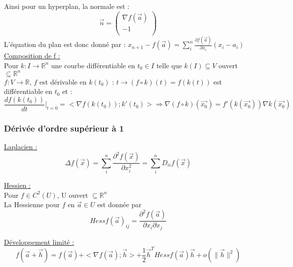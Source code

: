 \documentclass[../main.tex]{subfiles}
\begin{document}
Ainsi pour un hyperplan, la normale est :\\
\begin{equation}
    \vec{n} = \begin{pmatrix}
        \nabla f(\vec{a})\\
        -1\\
    \end{pmatrix}
\end{equation}
L'équation du plan est donc donné par : $x_{n+1} - f(\vec{a}) = \sum_i^n \frac{\partial f(\vec{a})}{\partial x_i}(x_i-a_i)$\\

\quad \underline{Composition de f :}\\
Pour $k: I\rightarrow \mathbb{R}^n$ une courbe différentiable en $t_0 \in I$ telle que $k(I) \subseteq V$ ouvert $\subseteq \mathbb{R}^n$\\
$f: V\rightarrow \mathbb{R}$, $f$ est dérivable en $k(t_0)$ : $t\rightarrow (f\circ k)(t) = f(k(t))$ est différentiable en $t_0$ et :\\
\begin{equation}
    \frac{df(k(t_0))}{dt}\rvert_{t=0} = <\nabla f(k(t_0)); k'(t_0)> \Rightarrow \nabla (f\circ k)(\vec{x_0}) = f'(k(\vec{x_0})) \nabla k(\vec{x_0})
\end{equation}

\subsubsection{Dérivée d'ordre supérieur à 1}
\quad \underline{Laplacien :}\\
\begin{equation}
    \Delta f(\vec{x}) = \sum_i^n \frac{\partial^2 f(\vec{x})}{\partial x_i^2} = \sum_i^n D_{ii} f(\vec{x})
\end{equation}

\quad \underline{Hessien :}\\
Pour $f\in C^2(U)$, U ouvert $\subseteq \mathbb{R}^n$\\
La Hessienne pour $f$ en $\vec{a} \in U$ est donnée par \\
\begin{equation}
    Hess f(\vec{a})_{ij} = \frac{\partial^2 f(\vec{a})}{\partial x_i \partial x_j}
\end{equation}

\quad \underline{Développement limité :}\\
\begin{equation}
    f(\vec{a}+\vec{h}) = f(\vec{a}) + <\nabla f(\vec{a}); \vec{h}> + \frac{1}{2} \vec{h}^T Hess f(\vec{a}) \vec{h} + o(\parallel \vec{h}\parallel^2)
\end{equation}
\end{document}
